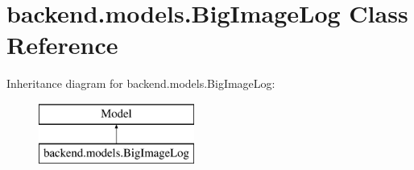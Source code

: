 \hypertarget{classbackend_1_1models_1_1_big_image_log}{}\section{backend.\+models.\+Big\+Image\+Log Class Reference}
\label{classbackend_1_1models_1_1_big_image_log}
Inheritance diagram for backend.\+models.\+Big\+Image\+Log\+:\begin{figure}[H]
\begin{center}
\leavevmode
\includegraphics[height=2.000000cm]{classbackend_1_1models_1_1_big_image_log}
\end{center}
\end{figure}
